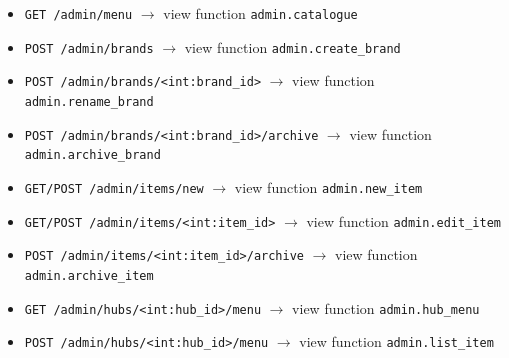 \begin{itemize}
\item \texttt{GET /\allowbreak{}admin/\allowbreak{}menu} \ensuremath{\rightarrow} view function \texttt{admin.\allowbreak{}catalogue}

\item \texttt{POST /\allowbreak{}admin/\allowbreak{}brands} \ensuremath{\rightarrow} view function \texttt{admin.\allowbreak{}create\_\allowbreak{}brand}

\item \texttt{POST /\allowbreak{}admin/\allowbreak{}brands/\allowbreak{}\textless{}int:brand\_\allowbreak{}id\textgreater{}} \ensuremath{\rightarrow} view function \texttt{admin.\allowbreak{}rename\_\allowbreak{}brand}

\item \texttt{POST /\allowbreak{}admin/\allowbreak{}brands/\allowbreak{}\textless{}int:brand\_\allowbreak{}id\textgreater{}/\allowbreak{}archive} \ensuremath{\rightarrow} view function \texttt{admin.\allowbreak{}archive\_\allowbreak{}brand}

\item \texttt{GET/\allowbreak{}POST /\allowbreak{}admin/\allowbreak{}items/\allowbreak{}new} \ensuremath{\rightarrow} view function \texttt{admin.\allowbreak{}new\_\allowbreak{}item}

\item \texttt{GET/\allowbreak{}POST /\allowbreak{}admin/\allowbreak{}items/\allowbreak{}\textless{}int:item\_\allowbreak{}id\textgreater{}} \ensuremath{\rightarrow} view function \texttt{admin.\allowbreak{}edit\_\allowbreak{}item}

\item \texttt{POST /\allowbreak{}admin/\allowbreak{}items/\allowbreak{}\textless{}int:item\_\allowbreak{}id\textgreater{}/\allowbreak{}archive} \ensuremath{\rightarrow} view function \texttt{admin.\allowbreak{}archive\_\allowbreak{}item}

\item \texttt{GET /\allowbreak{}admin/\allowbreak{}hubs/\allowbreak{}\textless{}int:hub\_\allowbreak{}id\textgreater{}/\allowbreak{}menu} \ensuremath{\rightarrow} view function \texttt{admin.\allowbreak{}hub\_\allowbreak{}menu}

\item \texttt{POST /\allowbreak{}admin/\allowbreak{}hubs/\allowbreak{}\textless{}int:hub\_\allowbreak{}id\textgreater{}/\allowbreak{}menu} \ensuremath{\rightarrow} view function \texttt{admin.\allowbreak{}list\_\allowbreak{}item}


\end{itemize}
